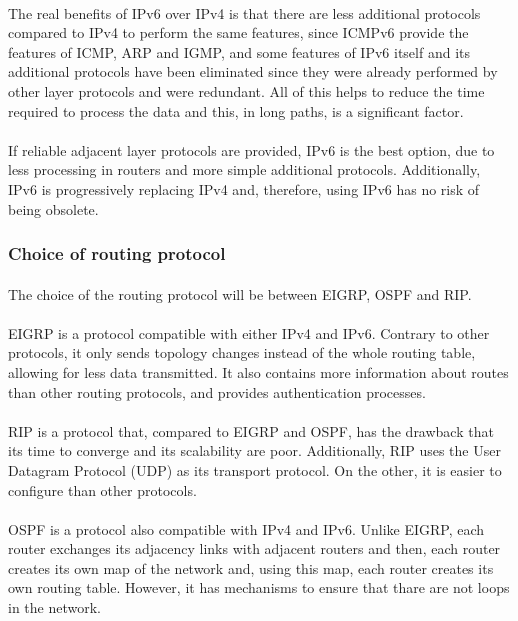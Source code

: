 \paragraph{}The real benefits of IPv6 over IPv4 is that there are less additional protocols compared to IPv4 to perform the same features, since ICMPv6 provide the features of ICMP, ARP and IGMP, and some features of IPv6 itself and its additional protocols have been eliminated since they were already performed by other layer protocols and were redundant. All of this helps to reduce the time required to process the data and this, in long paths, is a significant factor.
\paragraph{}If reliable adjacent layer protocols are provided, IPv6 is the best option, due to less processing in routers and more simple additional protocols. Additionally, IPv6 is progressively replacing IPv4 and, therefore, using IPv6 has no risk of being obsolete.

\subsubsection{Choice of routing protocol}
\paragraph{}The choice of the routing protocol will be between EIGRP, OSPF and RIP.
\paragraph{}EIGRP is a protocol compatible with either IPv4 and IPv6. Contrary to other protocols, it only sends topology changes instead of the whole routing table, allowing for less data transmitted. It also contains more information about routes than other routing protocols, and provides authentication processes.
\paragraph{}RIP is a protocol that, compared to EIGRP and OSPF, has the drawback that its time to converge and its scalability are poor. Additionally, RIP uses the User Datagram Protocol (UDP) as its transport protocol. On the other, it is easier to configure than other protocols.
\paragraph{}OSPF is a protocol also compatible with IPv4 and IPv6. Unlike EIGRP, each router exchanges its adjacency links with adjacent routers and then, each router creates its own map of the network and, using this map, each router creates its own routing table. However, it has mechanisms to ensure that thare are not loops in the network.
